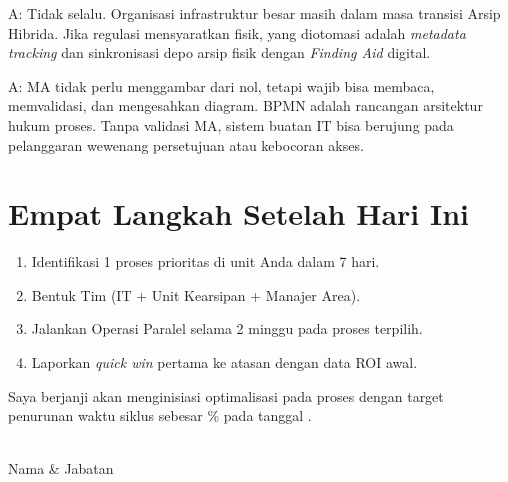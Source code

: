 \documentclass[12pt,a4paper]{report}
\begin{document}
\begin{plnbox}
A: Tidak selalu. Organisasi infrastruktur besar masih dalam masa transisi Arsip Hibrida. Jika regulasi mensyaratkan fisik, yang diotomasi adalah \textit{metadata tracking} dan sinkronisasi depo arsip fisik dengan \textit{Finding Aid} digital.
\end{plnbox}

\begin{plnbox}
A: MA tidak perlu menggambar dari nol, tetapi wajib bisa membaca, memvalidasi, dan mengesahkan diagram. BPMN adalah rancangan arsitektur hukum proses. Tanpa validasi MA, sistem buatan IT bisa berujung pada pelanggaran wewenang persetujuan atau kebocoran akses.
\end{plnbox}


\section{Empat Langkah Setelah Hari Ini}
\begin{enumerate}[leftmargin=*]
    \item Identifikasi 1 proses prioritas di unit Anda dalam 7 hari.
    \item Bentuk Tim (IT + Unit Kearsipan + Manajer Area).
    \item Jalankan Operasi Paralel selama 2 minggu pada proses terpilih.
    \item Laporkan \textit{quick win} pertama ke atasan dengan data ROI awal.
\end{enumerate}

\begin{plnbox}
\vspace{0.3cm}
Saya berjanji akan menginisiasi optimalisasi pada proses \dotfill dengan target penurunan waktu siklus sebesar \dotfill \% pada tanggal \dotfill.

\vspace{1.2cm}
\begin{flushright}
\begin{minipage}{0.5\textwidth}
\centering
\dotfill\\
Nama \& Jabatan
\end{minipage}
\end{flushright}
\end{plnbox}


\end{document}
